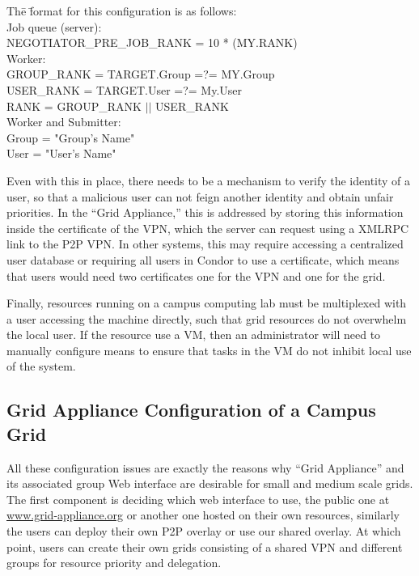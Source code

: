 \documentclass[conference]{IEEEtran}
\begin{document}
\begin{tabbing}
Th\=e \=format for this configuration is as follows:\\
\> Job queue (server):\\
\> \> NEGOTIATOR\_PRE\_JOB\_RANK = 10 * (MY.RANK) \\
\> Worker:\\
\> \> GROUP\_RANK = TARGET.Group =?= MY.Group \\
\> \> USER\_RANK = TARGET.User =?= My.User \\
\> \> RANK = GROUP\_RANK $\vert\vert$ USER\_RANK \\
\>  Worker and Submitter:\\
\> \> Group = "Group's Name"\\
\> \> User = "User's Name"
\end{tabbing}

Even with this in place, there needs to be a mechanism to verify the identity
of a user, so that a malicious user can not feign another identity and obtain
unfair priorities.  In the ``Grid Appliance,'' this is addressed by storing
this information inside the certificate of the VPN, which the server can
request using a XMLRPC link to the P2P VPN.  In other systems, this may require
accessing a centralized user database or requiring all users in Condor to use a
certificate, which means that users would need two certificates one for the VPN
and one for the grid.

Finally, resources running on a campus computing lab must be multiplexed with a
user accessing the machine directly, such that grid resources do not overwhelm
the local user.  If the resource use a VM, then an administrator will need to
manually configure means to ensure that tasks in the VM do not inhibit local
use of the system.

\subsection{Grid Appliance Configuration of a Campus Grid}

All these configuration issues are exactly the reasons why ``Grid Appliance''
and its associated group Web interface are desirable for small and medium scale
grids.  The first component is deciding which web interface to use, the public
one at \url{www.grid-appliance.org} or another one hosted on their own
resources, similarly the users can deploy their own P2P overlay or use our
shared overlay.  At which point, users can create their own grids consisting of
a shared VPN and different groups for resource priority and delegation.
\end{document}
